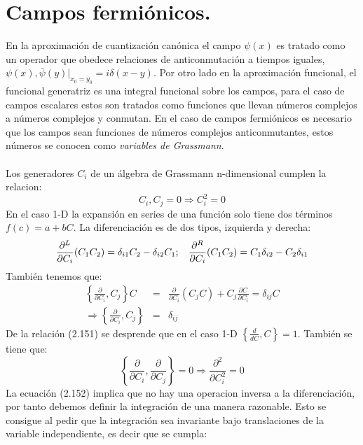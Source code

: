 \section{Campos fermiónicos.}
En la aproximación de cuantización canónica el campo $\psi(x)$ es tratado como un operador que obedece relaciones de anticonmutación a tiempos iguales, ${\psi(x),\bar{\psi}(y)}|_{x_0=y_0}=i\delta (x-y)$. Por otro lado en la aproximación funcional, el funcional generatriz es una integral funcional sobre los campos, para el caso de campos escalares estos son tratados como funciones que llevan números complejos a números complejos y conmutan. En el caso de campos fermiónicos es necesario que los campos sean funciones de números complejos anticonmutantes, estos números se conocen como \textit{variables de Grassmann}.
\\
\\
Los generadores $C_i$ de un álgebra de Grassmann n-dimensional cumplen la relacion:
\begin{equation}
{C_i,C_j}=0\Rightarrow C_i^2=0
\end{equation}
En el caso 1-D la expansión en series de una función solo tiene dos términos $f(c)=a+bC$. La diferenciación es de dos tipos, izquierda y derecha:
\begin{equation}
\frac{\partial^{L}}{\partial C_{i}}(C_{1}C_{2})=\delta_{i1}C_{2}-\delta_{i2}C_{1};\hspace{0.3cm}\frac{\partial^{R}}{\partial C_{i}}(C_{1}C_{2})=C_{1}\delta_{i2}-C_{2}\delta_{i1}
\end{equation}
También tenemos que:
\begin{eqnarray}
\nonumber \left\{ \frac{\partial}{\partial C_{i}},C_{j}\right\} C&=&\frac{\partial}{\partial C_{i}}(C_{j}C)+C_{j}\frac{\partial C}{\partial C_{i}}=\delta_{ij}C\\
\Rightarrow \left\{ \frac{\partial}{\partial C_{i}},C_{j}\right\} &=& \delta_{ij}
\end{eqnarray} 
De la relación (2.151) se desprende que en el caso 1-D $\left\{ \frac{d}{dC},C\right\} =1$. También se tiene que:
\begin{equation}
\left\{ \frac{\partial}{\partial C_{i}},\frac{\partial}{\partial C_{j}}\right\} =0\Rightarrow\frac{\partial^{2}}{\partial C_{i}^{2}}=0
\end{equation}
La ecuación (2.152) implica que no hay una operacion inversa a la diferenciación, por tanto debemos definir la integración de una manera razonable. Esto se consigue al pedir que la integración sea invariante bajo translaciones de la variable independiente, es decir que se cumpla:
